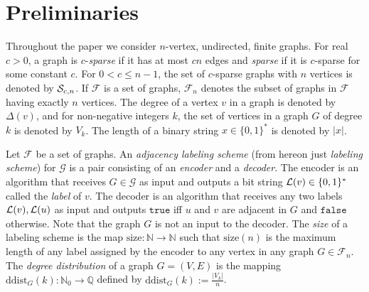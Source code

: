 
\section{Preliminaries}
Throughout the paper we consider $n$-vertex, undirected, finite graphs.
For real $c > 0$, a graph is $c$-\emph{sparse} if it has at most $cn$ edges and \emph{sparse} if it is $c$-sparse for some constant $c$. For $0 < c \leq n-1$, the set of $c$-sparse graphs with $n$ vertices is denoted by $ \mathcal{S}_{c,n}$.
If $\mathcal{F}$ is a set of graphs,  $\mathcal{F}_n$ denotes the subset of graphs in $\mathcal{F}$ having exactly $n$
vertices. The degree of a vertex $v$ in a graph is denoted by $\Delta(v)$, and for non-negative integers $k$,
the set of vertices in a graph $G$ of degree $k$  is denoted by $V_k$.
The length of a binary string $x \in \{ 0,1 \}^*$ is denoted by $\vert x \vert$.

Let  $\mathcal{F}$ be a set of graphs. An  \emph{adjacency labeling scheme} (from hereon just \emph{labeling scheme}) for  $\mathcal{G}$
is a pair consisting of an \emph{encoder} and a \emph{decoder}. The encoder is an algorithm that receives $G \in \mathcal{G}$ as input and outputs a bit string $ \mathcal{L}(v) \in \{0,1\}^*$ called the \emph{label} of $v$. The decoder 
is an algorithm that receives any two labels $ \mathcal{L}(v), \mathcal{L}(u)$ as input and outputs $\mathtt{true}$ if{f} $u$ and $v$
are adjacent in $G$ and $\mathtt{false}$ otherwise. Note that the graph $G$ is not an input to the decoder.
The \emph{size} of a labeling scheme is the map $\textrm{size} : \mathbb{N} \longrightarrow \mathbb{N}$
such that $\textrm{size}(n)$ is the maximum length of any label assigned by the encoder to any vertex in
any graph $G \in \mathcal{F}_n$. The \emph{degree distribution} of a graph $G = (V,E)$ is the mapping
 $\mathrm{ddist}_G (k) : \mathbb{N}_0 \longrightarrow \mathbb{Q}$
defined by $\mathrm{ddist}_G (k) := \frac{\vert V_k \vert} {n}$.




